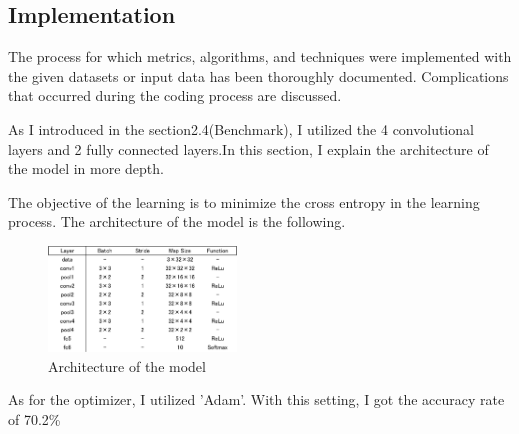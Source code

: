 \subsection{Implementation}
The process for which metrics, algorithms, and techniques were implemented with the given datasets or input data has been thoroughly documented. Complications that occurred during the coding process are discussed.


As I introduced in the section2.4(Benchmark), I utilized the 4 convolutional layers and 2 fully connected layers.In this section, I explain the architecture of the model in more depth.

The objective of the learning is to minimize the cross entropy in the learning process.
The architecture of the model is the following.

 \begin{figure}[H]

	\begin{center}
	\includegraphics[width=5cm]{picture/layer_architecture.png}
	\caption{Architecture of the model}
	\end{center}
	\label{fig:9}

\end{figure}


As for the optimizer, I utilized 'Adam'.
With this setting, I got the accuracy rate of 70.2\%